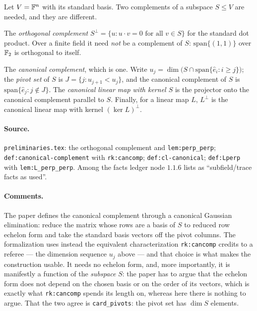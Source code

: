 \begin{definition}
\label{def:cl-canonical}
\leanok
Let $V = \mathbb{F}^n$ with its standard basis. Two complements of a subspace $S \leq V$ are needed,
and they are different.

The \emph{orthogonal complement} $S^\perp = \{u : u \cdot v = 0 \text{ for all } v \in S\}$
for the standard dot product. Over a finite field it need \emph{not} be a complement of $S$:
$\mathrm{span}\{(1,1)\}$ over $\mathbb{F}_2$ is orthogonal to itself.

The \emph{canonical complement}, which is one. Write $u_j = \dim\bigl(S \cap
\mathrm{span}\{\hat e_i : i \geq j\}\bigr)$; the \emph{pivot set} of $S$ is
$J = \{j : u_{j+1} < u_j\}$, and the canonical complement of $S$ is
$\mathrm{span}\{\hat e_j : j \notin J\}$. The \emph{canonical linear map with kernel $S$}
is the projector onto the canonical complement parallel to $S$. Finally, for a linear map $L$,
$L^\perp$ is the canonical linear map with kernel $(\ker L)^\perp$.
\end{definition}

\paragraph{Source.} \texttt{preliminaries.tex}: the orthogonal complement and
\texttt{lem:perp\_perp}; \texttt{def:canonical-complement} with \texttt{rk:cancomp};
\texttt{def:cl-canonical}; \texttt{def:Lperp} with \texttt{lem:L\_perp\_perp}. Among the
facts ledger node $1.1.6$ lists as ``subfield/trace facts as used''.

\paragraph{Comments.} The paper defines the canonical complement through a canonical Gaussian
elimination: reduce the matrix whose rows are a basis of $S$ to reduced row echelon form and
take the standard basis vectors off the pivot columns. The formalization uses instead the
equivalent characterization \texttt{rk:cancomp} credits to a referee --- the dimension
sequence $u_j$ above --- and that choice is what makes the construction usable. It needs no
echelon form, and, more importantly, it is manifestly a function of the \emph{subspace} $S$:
the paper has to argue that the echelon form does not depend on the chosen basis or on the
order of its vectors, which is exactly what \texttt{rk:cancomp} spends its length on, whereas
here there is nothing to argue. That the two agree is \texttt{card\_pivots}: the pivot set
has $\dim S$ elements.


